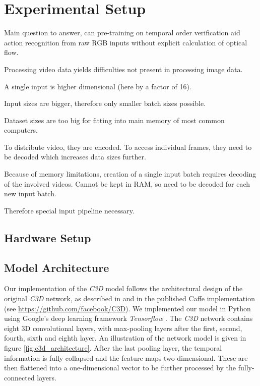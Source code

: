 \section{Experimental Setup}

Main question to answer, can pre-training on temporal order verification aid action recognition from raw RGB inputs without explicit calculation of optical flow.

Processing video data yields difficulties not present in processing image data.

A single input is higher dimensional (here by a factor of 16).

Input sizes are bigger, therefore only smaller batch sizes possible.

Dataset sizes are too big for fitting into main memory of most common computers.

To distribute video, they are encoded.
To access individual frames, they need to be decoded which increases data sizes further.

Because of memory limitations, creation of a single input batch requires decoding of the involved videos.
Cannot be kept in RAM, so need to be decoded for each new input batch.

Therefore special input pipeline necessary.

\subsection{Hardware Setup}


\subsection{Model Architecture}

Our implementation of the \textit{C3D} model follows the architectural design of the original \textit{C3D} network, as described in \cite{tran_learning_2015} and in the published Caffe implementation (see \mbox{\url{https://github.com/facebook/C3D}}).
We implemented our model in Python using Google's deep learning framework \textit{Tensorflow} \cite{abadi_tensorflow:_2016}.
The \textit{C3D} network contains eight 3D convolutional layers, with max-pooling layers after the first, second, fourth, sixth and eighth layer.
An illustration of the network model is given in figure \ref{fig:c3d_architecture}.
After the last pooling layer, the temporal information is fully collapsed and the feature maps two-dimensional.
These are then flattened into a one-dimensional vector to be further processed by the fully-connected layers.

